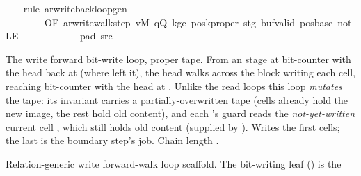 \begin{isabellebody}
%
\isadelimproof
\ \ %
\endisadelimproof
%
\isatagproof
{}\isamarkupfalse%
\ {\isacharparenleft}{\kern0pt}rule\ ar{\isacharunderscore}{\kern0pt}write{\isacharunderscore}{\kern0pt}back{\isacharunderscore}{\kern0pt}loop{\isacharunderscore}{\kern0pt}gen\isanewline
\ \ \ \ \ \ \ \ {\isacharbrackleft}{\kern0pt}OF\ ar{\isacharunderscore}{\kern0pt}write{\isacharunderscore}{\kern0pt}walk{\isacharunderscore}{\kern0pt}step\ vM\ qQ\ kge{}\ poskproper\ stg\ buf{\isacharunderscore}{\kern0pt}valid\ pos{\isacharunderscore}{\kern0pt}base\ notLE\isanewline
\ \ \ \ \ \ \ \ \ \ \ \ pad{}\ src{}{\isacharbrackright}{\kern0pt}{\isacharparenright}{\kern0pt}%
\endisatagproof
{\isafoldproof}%
%
\isadelimproof
%
\endisadelimproof
%
\begin{isamarkuptext}%
The write forward bit-write loop, proper tape.  From an
   stage at bit-counter  with the head back
  at  (where  left it), the head
  walks  across the block writing each cell, reaching
  bit-counter  with the head at .  Unlike the read loops this loop \emph{mutates} the
  tape: its invariant carries a partially-overwritten tape (cells
   already hold the new
   image, the rest hold old content), and each
  's  guard reads the
  \emph{not-yet-written} current cell , which
  still holds old content (supplied  by
  ).  Writes the first  cells; the last is
  the boundary step's job.  Chain length .%
\end{isamarkuptext}\isamarkuptrue%
%
\begin{isamarkuptext}%
Relation-generic write forward-walk loop scaffold.  The
  bit-writing leaf () is the 

\end{isamarkuptext}
\end{isabellebody}
